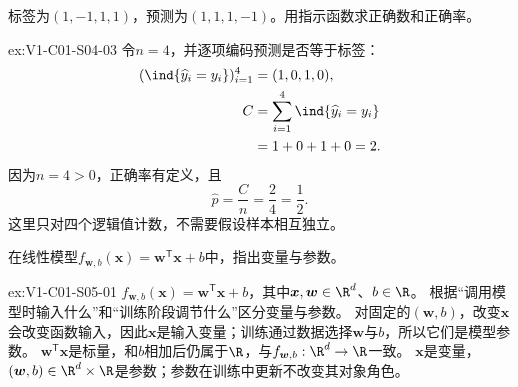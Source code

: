 \begin{SLChapterExercisePairSection}
\begin{exercise}[指示计数]\label{ex:V1-C01-S04-03}
标签为$(1,-1,1,1)$，预测为$(1,1,1,-1)$。用指示函数求正确数和正确率。
\end{exercise}
\label{sol:V1-C01-S04-03}
\begin{chapterexercisesolution}{ex:V1-C01-S04-03}
令$n=4$，并逐项编码预测是否等于标签：
\[
\begin{aligned}
(\ind\{\widehat y_i=y_i\})_{i=1}^{4}
&=(1,0,1,0),\\
C
&=\sum_{i=1}^{4}\ind\{\widehat y_i=y_i\}\\
&=1+0+1+0=2.
\end{aligned}
\]
因为$n=4>0$，正确率有定义，且
\[
\widehat p=\frac{C}{n}=\frac{2}{4}=\frac12.
\]
这里只对四个逻辑值计数，不需要假设样本相互独立。
\end{chapterexercisesolution}

\begin{exercise}[角色识别]\label{ex:V1-C01-S05-01}
在线性模型$f_{\boldsymbol{w},b}(\boldsymbol{x})=\boldsymbol{w}^{\mathsf T}\boldsymbol{x}+b$中，指出变量与参数。
\end{exercise}
\label{sol:V1-C01-S05-01}
\begin{chapterexercisesolution}{ex:V1-C01-S05-01}
\SolGiven $f_{\boldsymbol{w},b}(\boldsymbol{x})=\boldsymbol{w}^{\mathsf T}\boldsymbol{x}+b$，其中$\boldsymbol{x},\boldsymbol{w}\in\R^d$、$b\in\R$。
\SolPlan 根据“调用模型时输入什么”和“训练阶段调节什么”区分变量与参数。
\SolDerive 对固定的$(\boldsymbol{w},b)$，改变$\boldsymbol{x}$会改变函数输入，因此$\boldsymbol{x}$是输入变量；训练通过数据选择$\boldsymbol{w}$与$b$，所以它们是模型参数。
\SolCheck $\boldsymbol{w}^{\mathsf T}\boldsymbol{x}$是标量，和$b$相加后仍属于$\R$，与$f_{\boldsymbol w,b}:\R^d\to\R$一致。
\SolAnswer $\boldsymbol{x}$是变量，$(\boldsymbol{w},b)\in\R^d\times\R$是参数；参数在训练中更新不改变其对象角色。
\end{chapterexercisesolution}


\end{SLChapterExercisePairSection}
